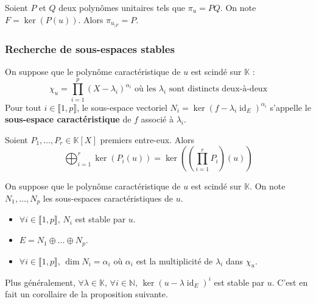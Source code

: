 	\begin{proposition}
		Soient $P$ et $Q$ deux polynômes unitaires tels que $\pi_u = PQ$. On note $F = \ker{(P(u))}$. Alors $\pi_{u_{|F}} = P$.
	\end{proposition}

	\subsubsection{Recherche de sous-espaces stables}


	\begin{definition}
		On suppose que le polynôme caractéristique de $u$ est scindé sur $\mathbb{K}$ :
		\[ \chi_u = \prod_{i=1}^p (X - \lambda_i)^{\alpha_i} \text{ où les } \lambda_i \text{ sont distincts deux-à-deux} \]
		Pour tout $i \in \llbracket 1, p \rrbracket$, le sous-espace vectoriel $N_i = \ker{(f - \lambda_i \operatorname{id}_E)^{\alpha_i}}$ s'appelle le \textbf{sous-espace caractéristique} de $f$ associé à $\lambda_i$.
	\end{definition}


	\begin{proposition}
		Soient $P_1, \dots, P_r \in \mathbb{K}[X]$ premiers entre-eux. Alors
		\[ \bigoplus_{i=1}^r \ker{(P_i(u))} = \ker \left( \left( \prod_{i=1}^r P_i \right) \left ( u \right) \right) \]
	\end{proposition}


	\begin{proposition}
		On suppose que le polynôme caractéristique de $u$ est scindé sur $\mathbb{K}$. On note $N_1, \dots, N_p$ les sous-espaces caractéristiques de $u$.
		\begin{itemize}
			\item $\forall i \in \llbracket 1, p \rrbracket$, $N_i$ est stable par $u$.
			\item $E = N_1 \oplus \dots \oplus N_p$.
			\item $\forall i \in \llbracket 1, p \rrbracket$, $\dim{N_i} = \alpha_i$ où $\alpha_i$ est la multiplicité de $\lambda_i$ dans $\chi_u$.
		\end{itemize}
	\end{proposition}


	\begin{remark}
		Plus généralement, $\forall \lambda \in \mathbb{K}, \, \forall i \in \mathbb{N}, \, \ker{(u - \lambda \operatorname{id}_E)^i}$ est stable par $u$. C'est en fait un corollaire de la proposition suivante.
	\end{remark}


